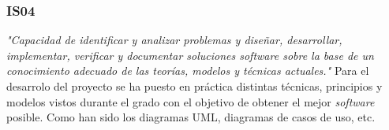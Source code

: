     \subsubsection{IS04}
    \textit{"Capacidad de identificar y analizar problemas y diseñar, desarrollar,
    implementar, verificar y documentar soluciones software sobre la base de
    un conocimiento adecuado de las teorías, modelos y técnicas actuales."}
    \medskip
    Para el desarrolo del proyecto se ha puesto en práctica distintas técnicas, principios y
    modelos vistos durante el grado con el objetivo de obtener el mejor \textit{software} posible.
    Como han sido los diagramas UML, diagramas de casos de uso, etc.